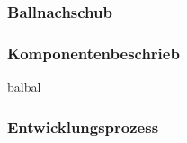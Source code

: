 \subsubsection{Ballnachschub}
\subsubsection*{Komponentenbeschrieb}

balbal

\subsubsection*{Entwicklungsprozess}